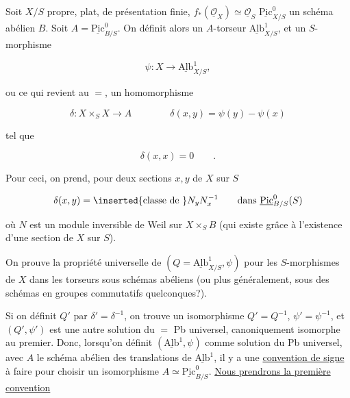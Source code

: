 
Soit $X/S$ propre, plat, de présentation finie, $f_*(\underline{\mathcal O}_X)\simeq\underline{\mathcal O}_S$  $\underline{\mathrm{Pic}}^0_{X/S}$ un schéma abélien $B$. Soit $A=\underline{\mathrm{Pic}}^0_{B/S}$. On définit alors un  $A$-torseur $\underline{\mathrm{Alb}}^1_{X/S}$, et un $S$-morphisme

\[
\psi\colon X\longrightarrow\underline{\mathrm{Alb}}^1_{X/S},
\]

ou ce qui revient au $=$, un homomorphisme

\[
\delta\colon X\times_S X\longrightarrow A\qquad\qquad\delta(x,y)=\psi(y)-\psi(x)
\]

tel que

\[
\delta(x,x)=0\qquad.
\]

Pour ceci, on prend, pour deux sections $x,y$ de $X$ sur $S$

\[
\delta(x,y)=\inserted{\text{classe de }}N_yN_x^{-1}\qquad\text{dans }\underline{\mathrm{Pic}}^0_{B/S}(S)
\]

où $N$ est un module inversible de Weil sur $X\times_S B$ (qui existe grâce à l'existence d'une section de $X$ sur $S$).

On prouve la propriété universelle de $(Q=\underline{\mathrm{Alb}}^1_{X/S},\psi)$ pour les $S$-morphismes de $X$ dans les  torseurs sous schémas abéliens (ou plus généralement, sous des schémas en groupes commutatifs quelconques?).

Si on définit $Q'$ par $\delta'=\delta^{-1}$, on trouve un isomorphisme $Q'=Q^{-1}$, $\psi'=\psi^{-1}$, et $(Q',\psi')$ est une autre solution du $=$ Pb universel, canoniquement isomorphe au premier. Donc, lorsqu'on définit $(\underline{\mathrm{Alb}}^1,\psi)$ comme solution du Pb universel, avec $A$ le schéma abélien des translations de $\underline{\mathrm{Alb}}^1$, il y a une \uline{convention de signe} à faire pour choisir un isomorphisme $A\simeq\underline{\mathrm{Pic}}^0_{B/S}$. \uline{Nous prendrons la première convention}
